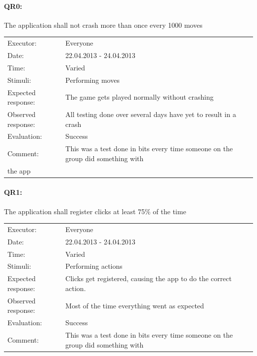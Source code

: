 \documentclass[12pt, a4paper]{article}
\begin{document}
\paragraph{QR0:} The application shall not crash more than once every 1000
moves\\
\begin{tabular}{  p{}  p{} }
    Executor: & Everyone \\
    Date: & 22.04.2013 - 24.04.2013 \\
    Time: & Varied \\
    Stimuli: & Performing moves \\
    Expected response: & The game gets played normally without crashing \\
    Observed response: & All testing done over several days have yet to result in a crash \\
    Evaluation: & Success \\
    Comment: & This was a test done in bits every time someone on the group did something with \\
the app \\
\end{tabular}

\paragraph{QR1:} The application shall register clicks at least 75\% of the time
\\
\begin{tabular}{  p{}  p{} }
	Executor: & Everyone \\
	Date: & 22.04.2013 - 24.04.2013 \\
	Time: & Varied \\
	Stimuli: & Performing actions\\
    Expected response: & Clicks get registered, causing the app to do the correct action. \\
    Observed response: & Most of the time everything went as expected \\
    Evaluation: & Success \\
    Comment: & This was a test done in bits every time someone on the group did something with \\
\end{tabular}
\end{document}
